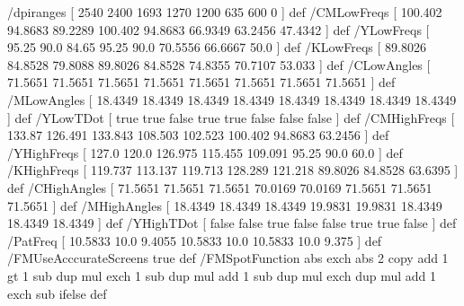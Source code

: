 %
%
/dpiranges   [  2540    2400    1693     1270    1200     635      600      0      ] def
/CMLowFreqs  [ 100.402  94.8683 89.2289 100.402  94.8683  66.9349  63.2456 47.4342 ] def
/YLowFreqs   [  95.25   90.0    84.65    95.25   90.0     70.5556  66.6667 50.0    ] def
/KLowFreqs   [  89.8026 84.8528 79.8088  89.8026 84.8528  74.8355  70.7107 53.033  ] def
/CLowAngles  [  71.5651 71.5651 71.5651 71.5651  71.5651  71.5651  71.5651 71.5651 ] def
/MLowAngles  [  18.4349 18.4349 18.4349 18.4349  18.4349  18.4349  18.4349 18.4349 ] def
/YLowTDot    [  true    true    false    true    true     false    false   false   ] def
/CMHighFreqs [ 133.87  126.491 133.843  108.503 102.523  100.402   94.8683 63.2456 ] def
/YHighFreqs  [ 127.0   120.0   126.975  115.455 109.091   95.25    90.0    60.0    ] def
/KHighFreqs  [ 119.737 113.137 119.713  128.289 121.218   89.8026  84.8528 63.6395 ] def
/CHighAngles [  71.5651 71.5651 71.5651  70.0169 70.0169  71.5651  71.5651 71.5651 ] def
/MHighAngles [  18.4349 18.4349 18.4349  19.9831 19.9831  18.4349  18.4349 18.4349 ] def
/YHighTDot   [  false   false   true     false   false    true     true    false   ] def
/PatFreq     [	10.5833 10.0     9.4055  10.5833 10.0	  10.5833  10.0	   9.375   ] def
%
/FMUseAcccurateScreens true def
%
%
/FMSpotFunction {abs exch abs 2 copy add 1 gt 
		{1 sub dup mul exch 1 sub dup mul add 1 sub }
		{dup mul exch dup mul add 1 exch sub }ifelse } def
%
%

